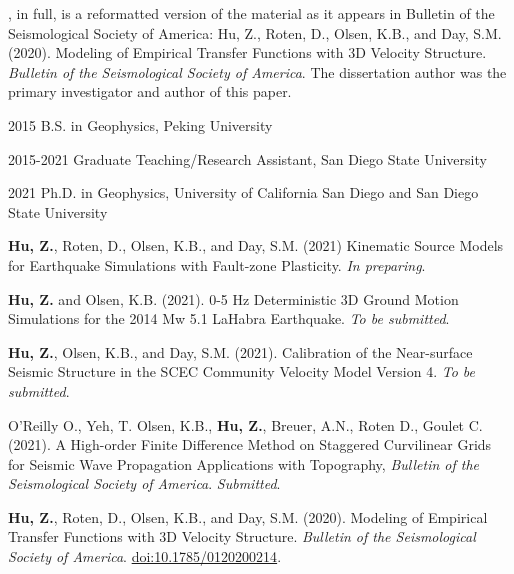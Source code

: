 \begin{frontmatter}
\begin{acknowledgements}
        , in full, is a reformatted version of the material as it appears in Bulletin of the Seismological Society of America: Hu, Z., Roten, D., Olsen, K.B., and Day, S.M. (2020). Modeling of Empirical Transfer Functions with 3D Velocity Structure. \emph{Bulletin of the Seismological Society of America}.
        The dissertation author was the primary investigator and author of this paper.

    \end{acknowledgements}


    \begin{vitapage}
        \begin{vita}
            \item[2015] B.S. in Geophysics, Peking University
            \item[2015-2021] Graduate Teaching/Research Assistant, San Diego State University
            \item[2021] Ph.D. in Geophysics, University of California San Diego and San Diego State University
        \end{vita}
        \begin{publications}
            \item \textbf{Hu, Z.}, Roten, D., Olsen, K.B., and Day, S.M. (2021) Kinematic Source Models for Earthquake Simulations with Fault-zone Plasticity. \emph{In preparing}.
            \item \textbf{Hu, Z.} and Olsen, K.B. (2021). 0-5 Hz Deterministic 3D Ground Motion Simulations for the 2014 Mw 5.1 LaHabra Earthquake. \emph{To be submitted}.
            \item \textbf{Hu, Z.}, Olsen, K.B., and Day, S.M. (2021). Calibration of the Near-surface Seismic Structure in the SCEC Community Velocity Model Version 4. \emph{To be submitted}.
            \item O'Reilly O., Yeh, T. Olsen, K.B., \textbf{Hu, Z.}, Breuer, A.N., Roten D., Goulet C. (2021). A High-order Finite Difference Method on Staggered Curvilinear Grids for Seismic Wave Propagation Applications with Topography, \emph{Bulletin of the Seismological Society of America}. \emph{Submitted}.
            \item \textbf{Hu, Z.}, Roten, D., Olsen, K.B., and Day, S.M. (2020). Modeling of Empirical Transfer Functions with 3D Velocity Structure. \emph{Bulletin of the Seismological Society of America}. \url{doi:10.1785/0120200214}.



\end{publications}
\end{vitapage}
\end{frontmatter}
